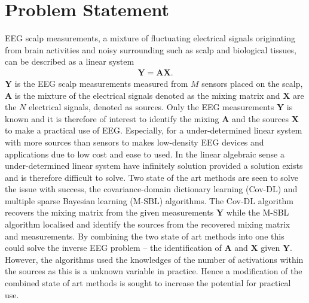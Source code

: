\chapter{Problem Statement}\label{ch:problemstatement}
EEG scalp measurements, a mixture of fluctuating electrical signals originating from brain activities and noisy surrounding such as scalp and biological tissues, can be described as a linear system
\begin{align*}
\mathbf{Y} = \mathbf{AX}.
\end{align*}
$\mathbf{Y}$ is the EEG scalp measurements measured from $M$ sensors placed on the scalp, $\mathbf{A}$ is the mixture of the electrical signals denoted as the mixing matrix and $\mathbf{X}$ are the $N$ electrical signals, denoted as sources. 
Only the EEG measurements $\mathbf{Y}$ is known and it is therefore of interest to identify the mixing $\mathbf{A}$ and the sources $\mathbf{X}$ to make a practical use of EEG. 
Especially, for a under-determined linear system with more sources than sensors to makes low-density EEG devices and applications due to low cost and ease to used. 
In the linear algebraic sense a under-determined linear system have infinitely solution provided a solution exists and is therefore difficult to solve.
Two state of the art methods are seen to solve the issue with success, the covariance-domain dictionary learning (Cov-DL) and multiple sparse Bayesian learning (M-SBL) algorithms. 
The Cov-DL algorithm recovers the mixing matrix from the given measurements $\mathbf{Y}$ while the M-SBL algorithm localised and identify the sources from the recovered mixing matrix and measurements. 
By combining the two state of art methods into one this could solve the inverse EEG problem -- the identification of $\mathbf{A}$ and $\mathbf{X}$ given $\mathbf{Y}$.
However, the algorithms used the knowledges of the number of activations within the sources as this is a unknown variable in practice. Hence a modification of the combined state of art methods is sought to increase the potential for practical use.



